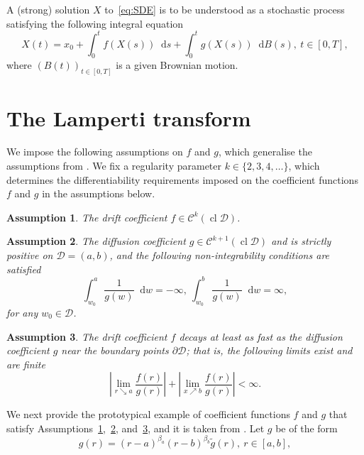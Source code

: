 \documentclass[11pt]{amsart}
\newtheorem{assumption}{Assumption}
\newcommand*\diff{\mathop{}\!\mathrm{d}}
\newcommand{\D}{\mathcal{D}}
\newcommand{\CD}{\operatorname{cl} \D}
\newcommand{\C}{\mathcal{C}}
\begin{document}
{A (strong) solution $X$ to~\eqref{eq:SDE} is to be understood as a stochastic process satisfying the following integral equation
\begin{equation*}
X(t) = x_{0} + \int_{0}^{t} f(X(s)) \diff s + \int_{0}^{t} g(X(s)) \diff B(s),\ t \in [0,T],
\end{equation*}
where $\left( B(t) \right)_{t \in [0,T]}$ is a given Brownian motion.

\section{The Lamperti transform}\label{sec:LampTrans}
We impose the following assumptions on $f$ and $g$, which generalise the assumptions from \cite{MR4737060}. We fix a regularity parameter $k \in \{2,3,4,\ldots\}$, which determines the differentiability requirements imposed on the coefficient functions $f$ and $g$ in the assumptions below.
\begin{assumption}\label{ass:f}
\emph{The drift coefficient} $f \in \C^{k} \left( \CD \right)$.
\end{assumption}
\begin{assumption}\label{ass:g}
\emph{The diffusion coefficient $g \in \C^{k+1} \left(\CD \right) $ and is strictly positive on $\D = (a,b)$,  and the following non-integrability conditions are satisfied}
\begin{equation}\label{eq:intCond}
\int_{w_{0}}^{a} \frac{1}{g(w)} \diff w = - \infty,\ \int_{w_{0}}^{b} \frac{1}{g(w)} \diff w = \infty,
\end{equation}
\emph{for any $w_{0} \in \D$.}
\end{assumption}
\begin{assumption}\label{ass:fg}
\emph{The drift coefficient $f$ decays at least as fast as the diffusion coefficient $g$ near the boundary points $\partial \D$; that is, the following limits exist and are finite}
\begin{equation}\label{eq:limCond}
\left| \lim_{r \searrow a} \frac{f(r)}{g(r)} \right| + \left| \lim_{x \nearrow b} \frac{f(r)}{g(r)} \right| < \infty.
\end{equation}
\end{assumption}
We next provide the prototypical example of coefficient functions $f$ and $g$ that satisfy Assumptions~\ref{ass:f},~\ref{ass:g}, and~\ref{ass:fg}, and it is taken from \cite{MR4737060}. Let $g$ be of the form
\begin{equation*}
g(r) = (r - a)^{\beta_{a}} (r - b)^{\beta_{b}} \tilde{g}(r),\ r \in [a,b],

\end{equation*}}
\end{document}
